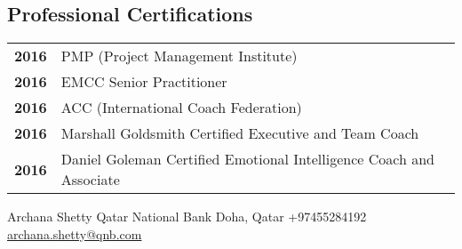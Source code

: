 \documentclass[lighthipster]{simplehipstercv}
\newlength{\rightcolwidth}
\begin{document}
\begin{paracol}{2}
\begin{minipage}[t]{0.3\textwidth}
\section*{Professional Certifications}
\begin{tabular}{>{\footnotesize\bfseries}r >{\footnotesize}p{}}
    2016 & PMP (Project Management Institute) \\
    2016 & EMCC Senior Practitioner \\
    2016 & ACC (International Coach Federation) \\
    2016 & Marshall Goldsmith Certified Executive and Team Coach \\
    2016 & Daniel Goleman Certified Emotional Intelligence Coach and Associate
\end{tabular}
\bigskip

\end{minipage}

\vfill{} 

\setlength{\parindent}{0pt}
\begin{minipage}[t]{\rightcolwidth}
\begin{center}\fontfamily{\sfdefault}\selectfont \color{black!70}
{\small Archana Shetty  Qatar National Bank  Doha, Qatar  +97455284192 \newline{} \protect\url{archana.shetty@qnb.com}
}
\end{center}
\end{minipage}

\end{paracol}
\end{document}

